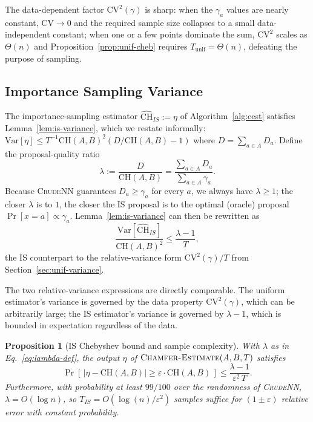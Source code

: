 \documentclass[conference]{IEEEtran}
\newtheorem{proposition}{Proposition}
\begin{document}
The data-dependent factor $\mathrm{CV}^2(\gamma)$ is sharp: when the
$\gamma_a$ values are nearly constant, $\mathrm{CV} \to 0$ and the
required sample size collapses to a small data-independent constant;
when one or a few points dominate the sum, $\mathrm{CV}^2$ scales as
$\Theta(n)$ and Proposition~\ref{prop:unif-cheb} requires
$T_\mathrm{unif} = \Theta(n)$, defeating the purpose of sampling.

\subsection{Importance Sampling Variance}
\label{sec:is-variance}

The importance-sampling estimator $\widehat{\mathrm{CH}}_{IS} := \eta$
of Algorithm~\ref{alg:cest} satisfies
Lemma~\ref{lem:is-variance}, which we restate informally:
$\mathrm{Var}[\eta] \leq T^{-1} \mathrm{CH}(A, B)^2 (D / \mathrm{CH}(A, B) - 1)$
where $D = \sum_{a \in A} D_a$. Define the proposal-quality ratio
\begin{equation}
    \lambda := \frac{D}{\mathrm{CH}(A, B)}
    = \frac{\sum_{a \in A} D_a}{\sum_{a \in A} \gamma_a}.
\label{eq:lambda-def}
\end{equation}
Because \textsc{CrudeNN} guarantees $D_a \geq \gamma_a$ for every $a$,
we always have $\lambda \geq 1$; the closer $\lambda$ is to $1$, the
closer the IS proposal is to the optimal (oracle) proposal
$\Pr[x = a] \propto \gamma_a$. Lemma~\ref{lem:is-variance} can then
be rewritten as
\begin{equation}
    \frac{\mathrm{Var}[\widehat{\mathrm{CH}}_{IS}]}{\mathrm{CH}(A, B)^2}
    \leq \frac{\lambda - 1}{T},
\label{eq:is-rel-variance}
\end{equation}
the IS counterpart to the relative-variance form
$\mathrm{CV}^2(\gamma) / T$ from Section~\ref{sec:unif-variance}.

The two relative-variance expressions are directly comparable. The
uniform estimator's variance is governed by the data property
$\mathrm{CV}^2(\gamma)$, which can be arbitrarily large; the IS
estimator's variance is governed by $\lambda - 1$, which is bounded
in expectation regardless of the data.

\begin{proposition}[IS Chebyshev bound and sample complexity]
\label{prop:is-cheb}
With $\lambda$ as in Eq.~\ref{eq:lambda-def}, the output $\eta$ of
$\textsc{Chamfer-Estimate}(A, B, T)$ satisfies
\begin{equation}
    \Pr\!\left[\, |\eta - \mathrm{CH}(A, B)| \geq
    \varepsilon \cdot \mathrm{CH}(A, B) \,\right]
    \leq \frac{\lambda - 1}{\varepsilon^2 \, T}.
\label{eq:is-cheb}
\end{equation}
Furthermore, with probability at least $99/100$ over the randomness of
\textsc{CrudeNN}, $\lambda = O(\log n)$, so
$T_{IS} = O(\log(n) / \varepsilon^2)$ samples suffice for
$(1 \pm \varepsilon)$ relative error with constant probability.
\end{proposition}
\end{document}
